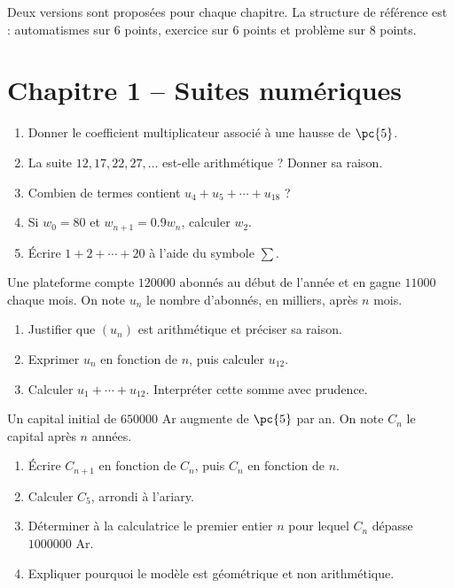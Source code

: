 Deux versions sont proposées pour chaque chapitre. La structure de référence est : automatismes sur 6 points, exercice sur 6 points et problème sur 8 points.
\section*{Chapitre 1 -- Suites numériques}
\begin{exercise}[1 -- Automatismes]
\begin{enumerate}
\item Donner le coefficient multiplicateur associé à une hausse de $\pc{5}$.
\item La suite $12,17,22,27,\ldots$ est-elle arithmétique ? Donner sa raison.
\item Combien de termes contient $u_4+u_5+\cdots+u_{18}$ ?
\item Si $w_0=80$ et $w_{n+1}=\num{0,9}w_n$, calculer $w_2$.
\item Écrire $1+2+\cdots+20$ à l'aide du symbole $\sum$.
\end{enumerate}
\end{exercise}
\begin{exercise}[2 -- Abonnements]
Une plateforme compte $\num{120000}$ abonnés au début de l'année et en gagne $\num{11000}$ chaque mois. On note $u_n$ le nombre d'abonnés, en milliers, après $n$ mois.
\begin{enumerate}
\item Justifier que $(u_n)$ est arithmétique et préciser sa raison.
\item Exprimer $u_n$ en fonction de $n$, puis calculer $u_{12}$.
\item Calculer $u_1+\cdots+u_{12}$. Interpréter cette somme avec prudence.
\end{enumerate}
\end{exercise}
\begin{exercise}
Un capital initial de $\num{650000}$ Ar augmente de $\pc{5}$ par an. On note $C_n$ le capital après $n$ années.
\begin{enumerate}
\item Écrire $C_{n+1}$ en fonction de $C_n$, puis $C_n$ en fonction de $n$.
\item Calculer $C_5$, arrondi à l'ariary.
\item Déterminer à la calculatrice le premier entier $n$ pour lequel $C_n$ dépasse $\num{1000000}$ Ar.
\item Expliquer pourquoi le modèle est géométrique et non arithmétique.
\end{enumerate}
\end{exercise}
